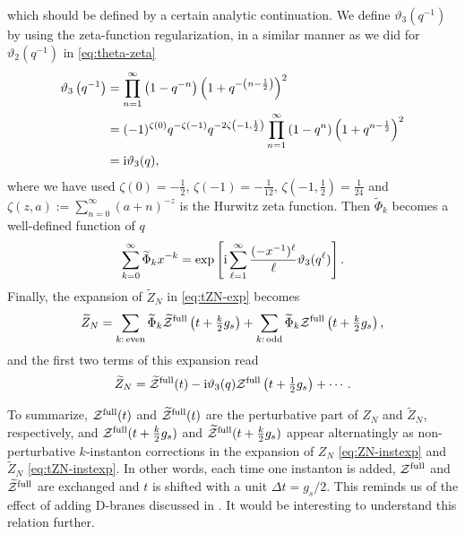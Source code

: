 \documentclass[11pt]{article}
\newcommand{\ri}{{\rm i}}
\newcommand{\hf}{\frac{1}{2}}
\def\lap{\Delta}
\renewcommand{\[}{\begin{eqnarray}}
\renewcommand{\]}{\end{eqnarray}}
\newcommand{\varth}{\vartheta}
\newcommand{\tZ}{{\widetilde Z}}
\newcommand{\tPhi}{{\widetilde\Phi}}
\newcommand{\Zefull}{{\cal Z}^{\text{full}}}
\newcommand{\Zofull}{{\widetilde{\cal Z}}^{\text{full}}}
\begin{document}
which should be defined by a certain analytic continuation.
%
We define $\varth_3(q^{-1})$ by using the zeta-function
regularization, in a similar manner as we did for $\vartheta_2(q^{-1})$
in \eqref{eq:theta-zeta}
%
\begin{align}
\begin{aligned}
\varth_3\left(q^{-1}\right)
 &=\prod_{n=1}^\infty\left(1-q^{-n}\right)
  \left(1+q^{-\left(n-\hf\right)}\right)^2\\
 &=(-1)^{\zeta(0)}q^{-\zeta(-1)}q^{-2\zeta\left(-1,\hf\right)}
   \prod_{n=1}^\infty\left(1-q^n\right)
  \left(1+q^{n-\hf}\right)^2\\
 &=\ri \vartheta_3(q),
\end{aligned} 
\end{align}
%
where we have used
$\zeta(0)=-\hf,\,\zeta(-1)=-\frac{1}{12},\,\zeta(-1,\hf)=\frac{1}{24}$
and $\zeta(z,a):=\sum_{n=0}^\infty(a+n)^{-z}$
is the Hurwitz zeta function.
Then $\tPhi_k$ becomes a well-defined
function of $q$
%
\begin{align}
\sum_{k=0}^\infty \tPhi_kx^{-k}
=\exp\left[\ri \sum_{\ell=1}^\infty \frac{(-x^{-1})^\ell}{\ell}
\vartheta_3(q^\ell)\right].
\end{align}
Finally,  the expansion of $\tZ_N$ in \eqref{eq:tZN-exp} becomes
\begin{equation}
\begin{aligned}
 \tZ_N
=\sum_{k:\,\text{even}}\tPhi_k\Zofull\left(t+\tfrac{k}{2}g_s\right)+
\sum_{k:\,\text{odd}}\tPhi_k\Zefull\left(t+\tfrac{k}{2}g_s\right),
\end{aligned} 
\label{eq:tZN-instexp}
\end{equation}
%
and the first two terms of this expansion read
\begin{align}
\tZ_N
 =\Zofull(t)
 -\ri\varth_3(q)\Zefull\left(t+\tfrac{1}{2} g_s\right) + \cdots.
\label{eq:tZN-acon}
\end{align}

To summarize, $\Zefull(t)$ and $\Zofull(t)$
are the perturbative part of $Z_N$ and $\tZ_N$, respectively,
and $\Zefull(t+\tfrac{k}{2} g_s)$ and $\Zofull(t+\tfrac{k}{2} g_s)$ appear alternatingly
as non-perturbative $k$-instanton corrections
in the expansion of $Z_N$ \eqref{eq:ZN-instexp}
and $\tZ_N$ \eqref{eq:tZN-instexp}.
In other words,
each time one instanton is added, $\Zefull$ and $\Zofull$
are exchanged and $t$ is shifted with
a unit $\lap t=g_s/2$.
This reminds us of the effect of adding D-branes 
discussed in \cite{Aganagic:2003qj,Aganagic:2011mi}.
It would be interesting to understand this relation further.
\end{document}

